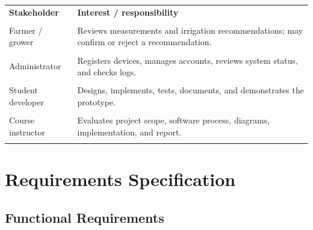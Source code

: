 \documentclass[12pt,a4paper]{report}
\begin{document}
\begin{longtable}{p{}p{}}

\toprule

\textbf{Stakeholder} & \textbf{Interest / responsibility}\\\\

\midrule

Farmer / grower & Reviews measurements and irrigation recommendations; may confirm or reject a recommendation.\\\\

Administrator & Registers devices, manages accounts, reviews system status, and checks logs.\\\\

Student developer & Designs, implements, tests, documents, and demonstrates the prototype.\\\\

Course instructor & Evaluates project scope, software process, diagrams, implementation, and report.\\\\

\bottomrule

\end{longtable}

\chapter{Requirements Specification}

\section{Functional Requirements}
\end{document}
